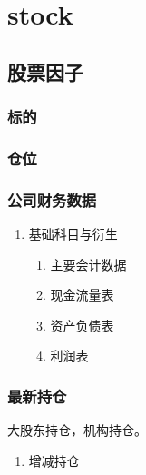 \documentclass[11pt]{article}
\author{weiwu}
\date{\textit{<2017-10-09 Mon>}}
\title{}
\begin{document}
\tableofcontents


\section{stock}
\label{sec:orgheadline54}
\subsection{股票因子}
\label{sec:orgheadline53}
\subsubsection{标的}
\label{sec:orgheadline1}
\subsubsection{仓位}
\label{sec:orgheadline2}
\subsubsection{公司财务数据}
\label{sec:orgheadline8}
\begin{enumerate}
\item 基础科目与衍生
\label{sec:orgheadline7}
\begin{enumerate}
\item 主要会计数据
\label{sec:orgheadline3}
\item 现金流量表
\label{sec:orgheadline4}
\item 资产负债表
\label{sec:orgheadline5}
\item 利润表
\label{sec:orgheadline6}
\end{enumerate}
\end{enumerate}
\subsubsection{最新持仓}
\label{sec:orgheadline10}
大股东持仓，机构持仓。
\begin{enumerate}
\item 增减持仓
\label{sec:orgheadline9}
\end{enumerate}
\end{document}
